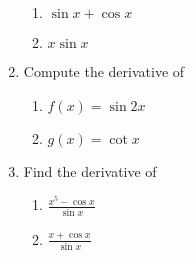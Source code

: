 \begin{enumerate}[label=\arabic*.,ref=\thesubsection.\theenumi]
%
\begin{enumerate}
\item  $\sin x + \cos x$
\item  $x \sin x$
\end{enumerate}
%
\item Compute the derivative of 
%
\begin{enumerate}
\item  $f(x) = \sin 2x$
\item  $g(x) = \cot x$
\end{enumerate}
%
\item Find the derivative of 
%
\begin{enumerate}
\item  $\frac{x^5-\cos x}{\sin x}$
\item  $\frac{x+\cos x}{\sin x}$
\end{enumerate}
\end{enumerate}
